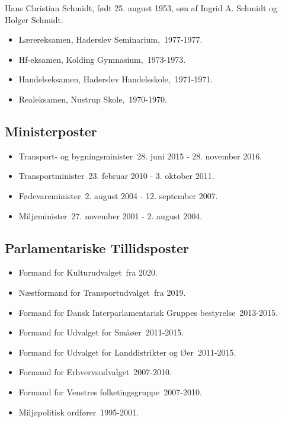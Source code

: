 \documentclass[11pt, a4paper]{awesome-cv}
\begin{document}
\makecvheader[R]
\makelettertitle
\begin{cvletter}
Hans Christian Schmidt, født 25. august 1953, søn af Ingrid A. Schmidt og Holger Schmidt.

\begin{itemize}
\item Lærereksamen, Haderslev Seminarium, 1977-1977.
\item Hf-eksamen, Kolding Gymnasium, 1973-1973.
\item Handelseksamen, Haderslev Handelsskole, 1971-1971.
\item Realeksamen, Nustrup Skole, 1970-1970.
\end{itemize}
\subsection*{Ministerposter}
\begin{itemize}
\item Transport- og bygningsminister 28. juni 2015 - 28. november 2016.
\item Transportminister 23. februar 2010 - 3. oktober 2011.
\item Fødevareminister 2. august 2004 - 12. september 2007.
\item Miljøminister 27. november 2001 - 2. august 2004.
\end{itemize}
\subsection*{Parlamentariske Tillidsposter}
\begin{itemize}
\item Formand for Kulturudvalget fra 2020.
\item Næstformand for Transportudvalget fra 2019.
\item Formand for Dansk Interparlamentarisk Gruppes bestyrelse 2013-2015.
\item Formand for Udvalget for Småøer 2011-2015.
\item Formand for Udvalget for Landdistrikter og Øer 2011-2015.
\item Formand for Erhvervsudvalget 2007-2010.
\item Formand for Venstres folketingsgruppe 2007-2010.
\item Miljøpolitisk ordfører 1995-2001.
\end{itemize}

\end{cvletter}
\end{document}
